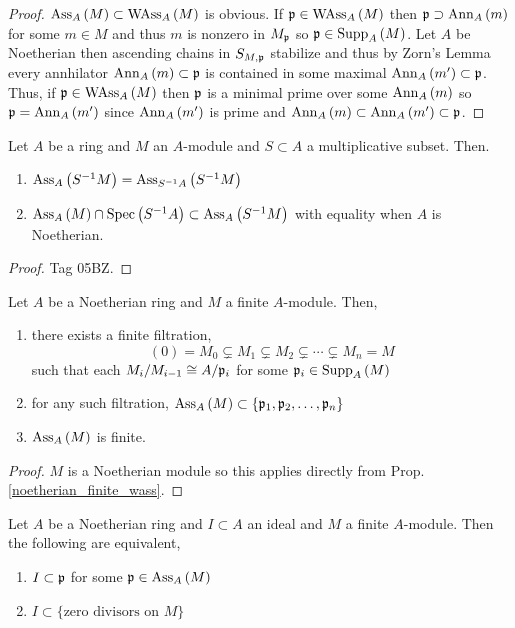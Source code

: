 \documentclass[12pt]{article}
\begin{document}
\begin{proof}
$\mathrm{Ass}_{A}\left( M \right) \subset \mathrm{WAss}_{A}\left(M \right)$ is obvious. If $\mathfrak{p} \in \mathrm{WAss}_{A}\left(M \right)$ then $\mathfrak{p} \supset \mathrm{Ann}_{A}\left(m\right)$ for some $m \in M$ and thus $m$ is nonzero in $M_{\mathfrak{p}}$ so $\mathfrak{p} \in \mathrm{Supp}_{A}\left(M \right)$. Let $A$ be Noetherian then ascending chains in $S_{M, \mathfrak{p}}$ stabilize and thus by Zorn's Lemma every annhilator $\mathrm{Ann}_{A}\left(m\right) \subset \mathfrak{p}$ is contained in some maximal $\mathrm{Ann}_{A}\left(m'\right) \subset \mathfrak{p}$. Thus, if $\mathfrak{p} \in \mathrm{WAss}_{A}\left(M \right)$ then $\mathfrak{p}$ is a minimal prime over some $\mathrm{Ann}_{A}\left(m\right)$ so $\mathfrak{p} = \mathrm{Ann}_{A}\left(m'\right)$ since $\mathrm{Ann}_{A}\left(m'\right)$ is prime and $\mathrm{Ann}_{A}\left(m\right) \subset \mathrm{Ann}_{A}\left(m'\right) \subset \mathfrak{p}$.
\end{proof}


\begin{lemma} \label{ass_primes_localization}
Let $A$ be a ring and $M$ an $A$-module and $S \subset A$ a multiplicative subset. Then.
\begin{enumerate}
\item $\mathrm{Ass}_{A}\left( S^{-1} M \right) = \mathrm{Ass}_{S^{-1} A}\left( S^{-1} M \right)$ 
\item $\mathrm{Ass}_{A}\left( M \right) \cap \mathrm{Spec}\left( S^{-1} A \right) \subset \mathrm{Ass}_{A}\left( S^{-1} M \right)$ with equality when $A$ is Noetherian.
\end{enumerate}
\end{lemma}

\begin{proof}
Tag 05BZ.
\end{proof}


\begin{proposition} \label{noetherian_finite_ass}
Let $A$ be a Noetherian ring and $M$ a finite $A$-module. Then,
\begin{enumerate}
\item there exists a finite filtration,
\[ (0) = M_0 \subsetneq M_1 \subsetneq M_2 \subsetneq \cdots \subsetneq M_n = M \]
such that each $M_{i} / M_{i-1} \cong A / \mathfrak{p}_{i}$ for some $\mathfrak{p}_i \in \mathrm{Supp}_{A} \left( M \right)$
\item for any such filtration, $\mathrm{Ass}_{A}\left( M \right) \subset \{ \mathfrak{p}_1, \mathfrak{p}_2, \dots, \mathfrak{p}_n\}$
\item $\mathrm{Ass}_{A}\left( M \right)$ is finite.
\end{enumerate}
\end{proposition}

\begin{proof}
$M$ is a Noetherian module so this applies directly from Prop. \ref{noetherian_finite_wass}.
\end{proof}

\begin{prop}
Let $A$ be a Noetherian ring and $I \subset A$ an ideal and $M$ a finite $A$-module. Then the following are equivalent,
\begin{enumerate}
\item $I \subset \mathfrak{p}$ for some $\mathfrak{p} \in \mathrm{Ass}_{A}\left( M \right)$
\item $I \subset \{ \text{zero divisors on } M \}$
\end{enumerate}
\end{prop}
\end{document}
